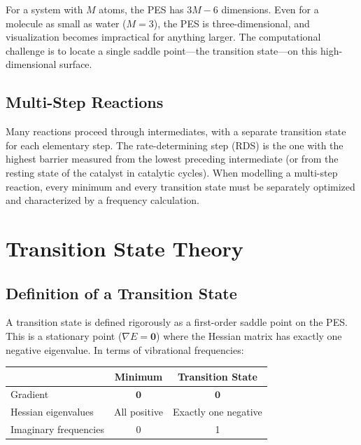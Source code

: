 \documentclass[11pt]{article}
\numberwithin{equation}{section}
\begin{document}
For a system with $M$ atoms, the PES has $3M-6$ dimensions. Even for a molecule as small as water ($M = 3$), the PES is three-dimensional, and visualization becomes impractical for anything larger. The computational challenge is to locate a single saddle point---the transition state---on this high-dimensional surface.

\subsection{Multi-Step Reactions}

Many reactions proceed through intermediates, with a separate transition state for each elementary step. The rate-determining step (RDS) is the one with the highest barrier measured from the lowest preceding intermediate (or from the resting state of the catalyst in catalytic cycles). When modelling a multi-step reaction, every minimum and every transition state must be separately optimized and characterized by a frequency calculation.


\section{Transition State Theory}
\label{sec:TST}

\subsection{Definition of a Transition State}

A transition state is defined rigorously as a first-order saddle point on the PES. This is a stationary point ($\nabla E = \mathbf{0}$) where the Hessian matrix has exactly one negative eigenvalue. In terms of vibrational frequencies:

\begin{center}
\begin{tabular}{lcc}
\toprule
& \textbf{Minimum} & \textbf{Transition State} \\
\midrule
Gradient & $\mathbf{0}$ & $\mathbf{0}$ \\
Hessian eigenvalues & All positive & Exactly one negative \\
Imaginary frequencies & 0 & 1 \\
\bottomrule
\end{tabular}
\end{center}
\end{document}
